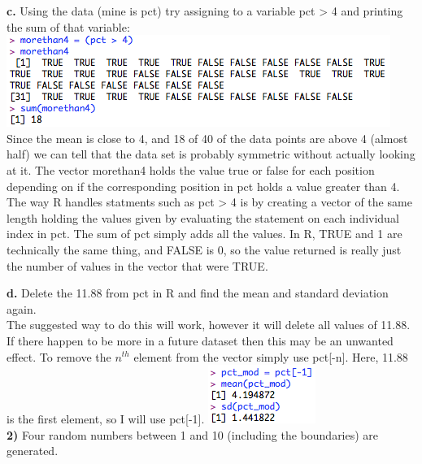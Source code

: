 \documentclass{scrartcl}
\begin{document}
\textbf{c.} Using the data (mine is pct) try assigning to a variable pct > 4 and printing the sum of that variable:\\
\includegraphics[keepaspectratio=true, scale=0.75]{1c.png}\\
Since the mean is close to 4, and 18 of 40 of the data points are above 4 (almost half) we can tell that the data set is probably symmetric without actually looking at it. The vector morethan4 holds the value true or false for each position depending on if the corresponding position in pct holds a value greater than 4. The way R handles statments such as pct > 4 is by creating a vector of the same length holding the values given by evaluating the statement on each individual index in pct. The sum of pct simply adds all the values. In R, TRUE and 1 are technically the same thing, and FALSE is 0, so the value returned is really just the number of values in the vector that were TRUE.

\textbf{d.} Delete the 11.88 from pct in R and find the mean and standard deviation again.\\
The suggested way to do this will work, however it will delete all values of 11.88. If there happen to be more in a future dataset then this may be an unwanted effect. To remove the $n^{th}$ element from the vector simply use pct[-n]. Here, 11.88 is the first element, so I will use pct[-1].
\includegraphics[keepaspectratio=true, scale=0.75]{1d.png}\\

\textbf{2)} Four random numbers between 1 and 10 (including the boundaries) are generated.\\
\end{document}

